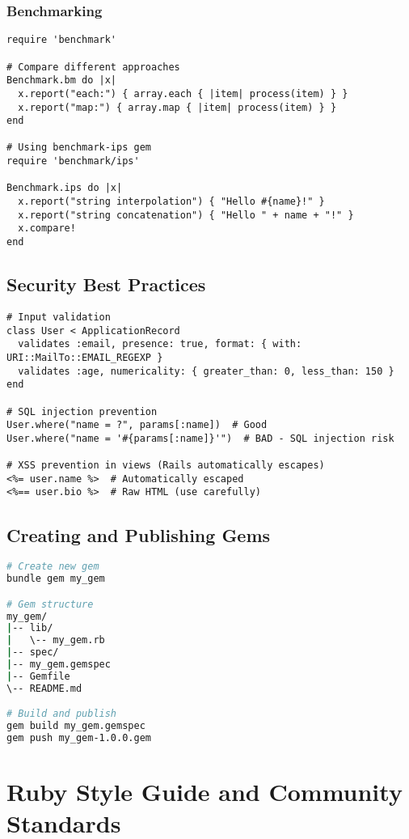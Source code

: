 \documentclass[12pt,a4paper]{article}
\begin{document}
\subsubsection{Benchmarking}

\begin{lstlisting}
require 'benchmark'

# Compare different approaches
Benchmark.bm do |x|
  x.report("each:") { array.each { |item| process(item) } }
  x.report("map:") { array.map { |item| process(item) } }
end

# Using benchmark-ips gem
require 'benchmark/ips'

Benchmark.ips do |x|
  x.report("string interpolation") { "Hello #{name}!" }
  x.report("string concatenation") { "Hello " + name + "!" }
  x.compare!
end
\end{lstlisting}

\subsection{Security Best Practices}

\begin{lstlisting}
# Input validation
class User < ApplicationRecord
  validates :email, presence: true, format: { with: URI::MailTo::EMAIL_REGEXP }
  validates :age, numericality: { greater_than: 0, less_than: 150 }
end

# SQL injection prevention
User.where("name = ?", params[:name])  # Good
User.where("name = '#{params[:name]}'")  # BAD - SQL injection risk

# XSS prevention in views (Rails automatically escapes)
<%= user.name %>  # Automatically escaped
<%== user.bio %>  # Raw HTML (use carefully)
\end{lstlisting}

\subsection{Creating and Publishing Gems}

\begin{lstlisting}[language=bash]
# Create new gem
bundle gem my_gem

# Gem structure
my_gem/
|-- lib/
|   \-- my_gem.rb
|-- spec/
|-- my_gem.gemspec
|-- Gemfile
\-- README.md

# Build and publish
gem build my_gem.gemspec
gem push my_gem-1.0.0.gem
\end{lstlisting}

\section{Ruby Style Guide and Community Standards}
\end{document}
